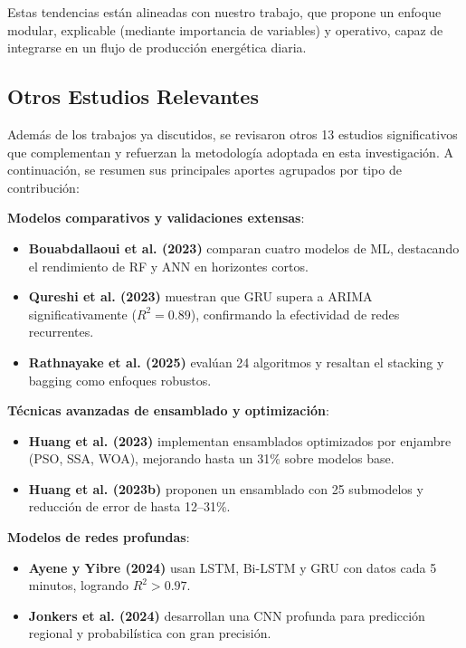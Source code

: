\documentclass[conference]{IEEEtran}
\begin{document}
Estas tendencias están alineadas con nuestro trabajo, que propone un enfoque modular, explicable (mediante importancia de variables) y operativo, capaz de integrarse en un flujo de producción energética diaria.
	
\subsection{Otros Estudios Relevantes}
	
Además de los trabajos ya discutidos, se revisaron otros 13 estudios significativos que complementan y refuerzan la metodología adoptada en esta investigación. A continuación, se resumen sus principales aportes agrupados por tipo de contribución:
	
\textbf{Modelos comparativos y validaciones extensas}:
\begin{itemize}[leftmargin=*,itemsep=1pt]
\item \textbf{Bouabdallaoui et al. (2023)} comparan cuatro modelos de ML, destacando el rendimiento de RF y ANN en horizontes cortos.

\item \textbf{Qureshi et al. (2023)} muestran que GRU supera a ARIMA significativamente (\(R^2 = 0.89\)), confirmando la efectividad de redes recurrentes.

\item \textbf{Rathnayake et al. (2025)} evalúan 24 algoritmos y resaltan el stacking y bagging como enfoques robustos.
\end{itemize}
	
\textbf{Técnicas avanzadas de ensamblado y optimización}:
\begin{itemize}[leftmargin=*,itemsep=1pt]
\item \textbf{Huang et al. (2023)} implementan ensamblados optimizados por enjambre (PSO, SSA, WOA), mejorando hasta un 31\% sobre modelos base.

\item \textbf{Huang et al. (2023b)} proponen un ensamblado con 25 submodelos y reducción de error de hasta 12–31\%.
\end{itemize}
	
\textbf{Modelos de redes profundas}:
\begin{itemize}[leftmargin=*,itemsep=1pt]

\item \textbf{Ayene y Yibre (2024)} usan LSTM, Bi-LSTM y GRU con datos cada 5 minutos, logrando \(R^2 > 0.97\).

\item \textbf{Jonkers et al. (2024)} desarrollan una CNN profunda para predicción regional y probabilística con gran precisión.

\end{itemize}
	
\end{document}
